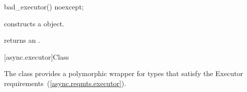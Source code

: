 \begin{itemdecl}
bad_executor() noexcept;
\end{itemdecl}

\begin{itemdescr}
\pnum
\effects constructs a  object.

\pnum
\postconditions
{} returns an  \ntbs.
\end{itemdescr}



[async.executor]{Class }

%
\pnum
The  class provides a polymorphic wrapper for types that satisfy the Executor requirements~(\ref{async.reqmts.executor}).


